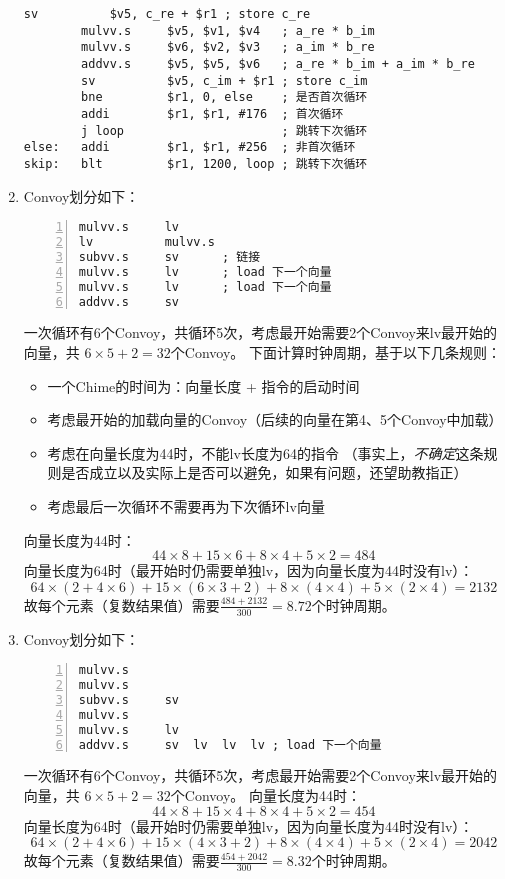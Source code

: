\documentclass{article}
\begin{document}
\begin{enumerate}
\begin{lstlisting}[language={[x86masm]Assembler}]
        sv          $v5, c_re + $r1 ; store c_re
        mulvv.s     $v5, $v1, $v4   ; a_re * b_im
        mulvv.s     $v6, $v2, $v3   ; a_im * b_re
        addvv.s     $v5, $v5, $v6   ; a_re * b_im + a_im * b_re
        sv          $v5, c_im + $r1 ; store c_im
        bne         $r1, 0, else    ; 是否首次循环
        addi        $r1, $r1, #176  ; 首次循环
        j loop                      ; 跳转下次循环
else:   addi        $r1, $r1, #256  ; 非首次循环
skip:   blt         $r1, 1200, loop ; 跳转下次循环
        \end{lstlisting}
        \item Convoy划分如下：
        \begin{lstlisting}[language={[x86masm]Assembler}, numbers=left]
mulvv.s     lv
lv          mulvv.s
subvv.s     sv      ; 链接
mulvv.s     lv      ; load 下一个向量
mulvv.s     lv      ; load 下一个向量
addvv.s     sv
        \end{lstlisting}
        一次循环有6个Convoy，共循环5次，考虑最开始需要2个Convoy来lv最开始的向量，共
        $6\times5 + 2 = 32$个Convoy。
        下面计算时钟周期，基于以下几条规则：
        \begin{itemize}
            \item 一个Chime的时间为：向量长度 + 指令的启动时间
            \item 考虑最开始的加载向量的Convoy（后续的向量在第4、5个Convoy中加载）
            \item 考虑在向量长度为44时，不能lv长度为64的指令
            （事实上，\emph{不确定}这条规则是否成立以及实际上是否可以避免，如果有问题，还望助教指正）
            \item 考虑最后一次循环不需要再为下次循环lv向量
        \end{itemize}
        向量长度为44时：
        \[44 \times 8 + 15\times6 + 8\times4 + 5\times2 = 484\]
        向量长度为64时（最开始时仍需要单独lv，因为向量长度为44时没有lv）：
        \[64\times(2+4\times6) + 15\times(6\times3 + 2) + 8\times(4\times4) + 5\times(2\times4) = 2132\]
        故每个元素（复数结果值）需要$\frac{484 + 2132}{300} = 8.72$个时钟周期。
        \item Convoy划分如下：
        \begin{lstlisting}[language={[x86masm]Assembler}, numbers = left]
mulvv.s
mulvv.s
subvv.s     sv
mulvv.s
mulvv.s     lv
addvv.s     sv  lv  lv  lv ; load 下一个向量
        \end{lstlisting}
        一次循环有6个Convoy，共循环5次，考虑最开始需要2个Convoy来lv最开始的向量，共
        $6\times5 + 2 = 32$个Convoy。
        向量长度为44时：
        \[44 \times 8 + 15\times4 + 8\times4 + 5\times2 = 454\]
        向量长度为64时（最开始时仍需要单独lv，因为向量长度为44时没有lv）：
        \[64\times(2+4\times6) + 15\times(4\times3 + 2) + 8\times(4\times4) + 5\times(2\times4) = 2042\]
        故每个元素（复数结果值）需要$\frac{454 + 2042}{300} = 8.32$个时钟周期。
    \end{enumerate}
\end{document}
